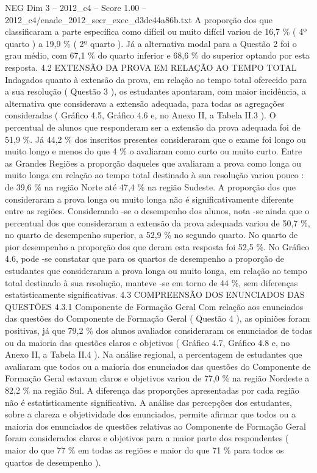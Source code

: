 \begin{textsample}{NEG Dim 3 – 2012\_c4 – Score 1.00 – 2012\_c4/enade\_2012\_secr\_exec\_d3dc44a86b.txt}
A proporção dos que classificaram a parte específica como difícil ou muito difícil variou de 16,7 \% ( 4º quarto ) a 19,9 \% ( 2º quarto ).
Já a alternativa modal para a Questão 2 foi o grau médio, com 67,1 \% do quarto inferior e 68,6 \% do superior optando por esta resposta. 4.2 EXTENSÃO DA PROVA EM RELAÇÃO AO TEMPO TOTAL Indagados quanto à extensão da prova, em relação ao tempo total oferecido para a sua resolução ( Questão 3 ), os estudantes apontaram, com maior incidência, a alternativa que considerava a extensão adequada, para todas as agregações consideradas ( Gráfico 4.5, Gráfico 4.6 e, no Anexo II, a Tabela II.3 ).
O percentual de alunos que responderam ser a extensão da prova adequada foi de 51,9 \%.
Já 44,2 \% dos inscritos presentes consideraram que o exame foi longo ou muito longo e menos do que 4 \% o avaliaram como curto ou muito curto.
Entre as Grandes Regiões a proporção daqueles que avaliaram a prova como longa ou muito longa em relação ao tempo total destinado à sua resolução variou pouco : de 39,6 \% na região Norte até 47,4 \% na região Sudeste.
A proporção dos que consideraram a prova longa ou muito longa não é significativamente diferente entre as regiões.
Considerando -se o desempenho dos alunos, nota -se ainda que o percentual dos que consideraram a extensão da prova adequada variou de 50,7 \%, no quarto de desempenho superior, a 52,9 \% no segundo quarto.
No quarto de pior desempenho a proporção dos que deram esta resposta foi 52,5 \%.
No Gráfico 4.6, pode -se constatar que para os quartos de desempenho a proporção de estudantes que consideraram a prova longa ou muito longa, em relação ao tempo total destinado à sua resolução, manteve -se em torno de 44 \%, sem diferenças estatisticamente significativas. 4.3 COMPREENSÃO DOS ENUNCIADOS DAS QUESTÕES 4.3.1 Componente de Formação Geral Com relação aos enunciados das questões do Componente de Formação Geral ( Questão 4 ), as opiniões foram positivas, já que 79,2 \% dos alunos avaliados consideraram os enunciados de todas ou da maioria das questões claros e objetivos ( Gráfico 4.7, Gráfico 4.8 e, no Anexo II, a Tabela II.4 ).
Na análise regional, a percentagem de estudantes que avaliaram que todos ou a maioria dos enunciados das questões do Componente de Formação Geral estavam claros e objetivos variou de 77,0 \% na região Nordeste a 82,2 \% na região Sul.
A diferença das proporções apresentadas por cada região não é estatisticamente significativa.
A análise das percepções dos estudantes, sobre a clareza e objetividade dos enunciados, permite afirmar que todos ou a maioria dos enunciados de questões relativas ao Componente de Formação Geral foram considerados claros e objetivos para a maior parte dos respondentes ( maior do que 77 \% em todas as regiões e maior do que 71 \% para todos os quartos de desempenho ).

\end{textsample}
